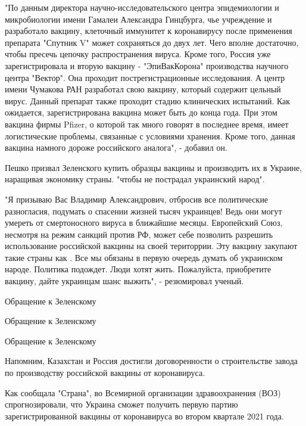 "По данным директора научно-исследовательского центра эпидемиологии и
микробиологии имени Гамалеи Александра Гинцбурга, чье учреждение и разработало
вакцину, клеточный иммунитет к коронавирусу после применения препарата "Спутник
V" может сохраняться до двух лет. Чего вполне достаточно, чтобы пресечь цепочку
распространения вируса. Кроме того, Россия уже зарегистрировала и вторую
вакцину - "ЭпиВакКорона" производства научного центра "Вектор". Она проходит
пострегистрационные исследования. А центр имени Чумакова РАН разработал свою
вакцину, который содержит цельный вирус. Данный препарат также проходит стадию
клинических испытаний. Как ожидается, зарегистрирована вакцина может быть до
конца года. При этом вакцина фирмы Pfizer, о которой так много говорят в
последнее время, имеет логистические проблемы, связанные с условиями хранения.
Кроме того, данная вакцина намного дороже российского аналога", - добавил он. 

Пешко призвал Зеленского купить образцы вакцины и производить их в Украине,
наращивая экономику страны. "чтобы не пострадал украинский народ".

"Я призываю Вас Владимир Александрович, отбросив все политические разногласия,
подумать о спасении жизней тысяч украинцев! Ведь они могут умереть от
смертоносного вируса в ближайшие месяцы. Европейский Союз, несмотря на режим
санкций против РФ, может себе позволить разрешить использование российской
вакцины на своей територрии. Эту вакцину закупают такие страны как . Все мы
обязаны в первую очередь думать об украинском народе. Политика подождет. Люди
хотят жить. Пожалуйста, приобретите вакцину, дайте украинцам шанс выжить", -
резюмировал ученый. 

Обращение к Зеленскому

Обращение к Зеленскому

Обращение к Зеленскому

Напомним, Казахстан и Россия достигли договоренности о строительстве
завода по производству российской вакцины от коронавируса.

Как сообщала "Страна", во Всемирной организации здравоохранения (ВОЗ)
спрогнозировали, что Украина сможет получить первую
партию зарегистрированной вакцины от коронавируса во втором квартале 2021
года.


